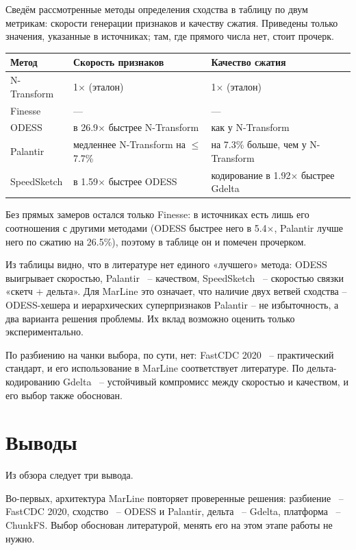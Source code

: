 \documentclass[a4paper]{article}
\begin{document}
Сведём рассмотренные методы определения сходства в таблицу по двум метрикам:
скорости генерации признаков и качеству сжатия. Приведены только значения,
указанные в источниках; там, где прямого числа нет, стоит прочерк.

\begin{center}
\begin{tabular}{l l l}
\hline
\textbf{Метод} & \textbf{Скорость признаков} & \textbf{Качество сжатия} \\
\hline
N-Transform & 1$\times$ (эталон) & 1$\times$ (эталон) \\
Finesse & --- & --- \\
ODESS & в 26.9$\times$ быстрее N-Transform & как у N-Transform \\
Palantir & медленнее N-Transform на $\le$7.7\% & на 7.3\% больше, чем у N-Transform\\
SpeedSketch & в 1.59$\times$ быстрее ODESS & кодирование в 1.92$\times$ быстрее Gdelta \\
\hline
\end{tabular}
\end{center}

Без прямых замеров остался только Finesse: в источниках есть лишь его
соотношения с другими методами (ODESS быстрее него в 5.4$\times$, Palantir
лучше него по сжатию на 26.5\%), поэтому в таблице он и помечен прочерком.

Из таблицы видно, что в литературе нет единого «лучшего» метода: ODESS
выигрывает скоростью, Palantir ~-- качеством, SpeedSketch ~-- скоростью
связки «скетч + дельта». Для MarLine это означает, что наличие двух ветвей
сходства -- ODESS-хешера и иерархических суперпризнаков Palantir -- не
избыточность, а два варианта решения проблемы. Их вклад возможно
оценить только экспериментально.

По разбиению на чанки выбора, по сути, нет: FastCDC 2020 ~-- практический
стандарт, и его использование в MarLine соответствует литературе. По
дельта-кодированию Gdelta ~-- устойчивый компромисс между скоростью и
качеством, и его выбор также обоснован.

\section{Выводы}

Из обзора следует три вывода.

Во-первых, архитектура MarLine повторяет проверенные решения: разбиение ~--
FastCDC 2020, сходство ~-- ODESS и Palantir, дельта ~-- Gdelta, платформа ~--
ChunkFS. Выбор обоснован литературой, менять его на этом этапе работы не
нужно.
\end{document}
